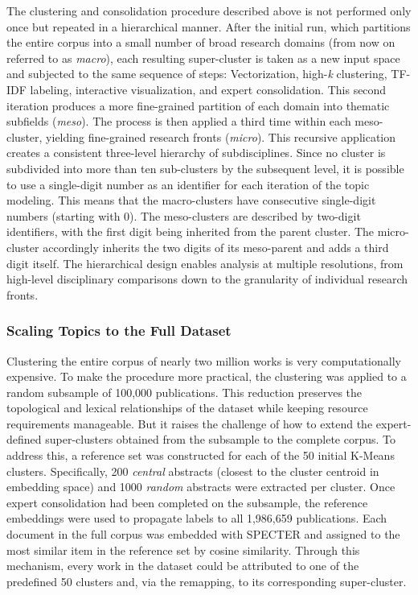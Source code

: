 \documentclass{article}
\begin{document}
	The clustering and consolidation procedure described above is not performed only once but repeated in a hierarchical manner. After the initial run, which partitions the entire corpus into a small number of broad research domains (from now on referred to as \textit{macro}), each resulting super-cluster is taken as a new input space and subjected to the same sequence of steps: Vectorization, high-\textit{k} clustering, TF-IDF labeling, interactive visualization, and expert consolidation. This second iteration produces a more fine-grained partition of each domain into thematic subfields (\textit{meso}). The process is then applied a third time within each meso-cluster, yielding fine-grained research fronts (\textit{micro}). This recursive application creates a consistent three-level hierarchy of subdisciplines. Since no cluster is subdivided into more than ten sub-clusters by the subsequent level, it is possible to use a single-digit number as an identifier for each iteration of the topic modeling. This means that the macro-clusters have consecutive single-digit numbers (starting with 0). The meso-clusters are described by two-digit identifiers, with the first digit being inherited from the parent cluster. The micro-cluster accordingly inherits the two digits of its meso-parent and adds a third digit itself. The hierarchical design enables analysis at multiple resolutions, from high-level disciplinary comparisons down to the granularity of individual research fronts.
	
	\subsubsection{Scaling Topics to the Full Dataset}
	
	Clustering the entire corpus of nearly two million works is very computationally expensive. To make the procedure more practical, the clustering was applied to a random subsample of 100,000 publications. This reduction preserves the topological and lexical relationships of the dataset while keeping resource requirements manageable. But it raises the challenge of how to extend the expert-defined super-clusters obtained from the subsample to the complete corpus. To address this, a reference set was constructed for each of the 50 initial K-Means clusters. Specifically, 200 \textit{central} abstracts (closest to the cluster centroid in embedding space) and 1000 \textit{random} abstracts were extracted per cluster. Once expert consolidation had been completed on the subsample, the reference embeddings were used to propagate labels to all 1,986,659 publications. Each document in the full corpus was embedded with SPECTER and assigned to the most similar item in the reference set by cosine similarity. Through this mechanism, every work in the dataset could be attributed to one of the predefined 50 clusters and, via the remapping, to its corresponding super-cluster.
	
\end{document}
